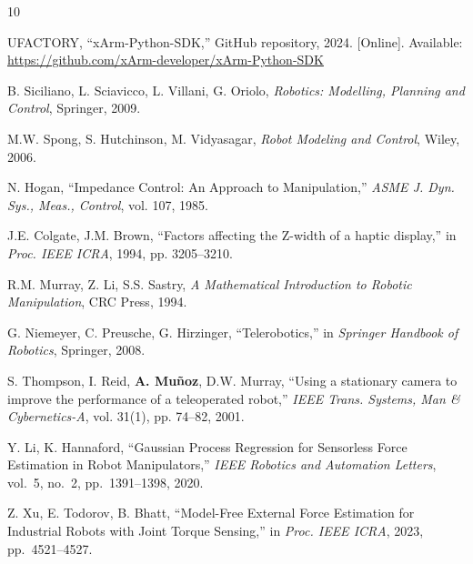 \documentclass[journal,10pt,twoside]{IEEEtran}
\begin{document}
\begin{thebibliography}{10}

  UFACTORY, ``xArm-Python-SDK,''
  GitHub repository, 2024.
  [Online]. Available: \url{https://github.com/xArm-developer/xArm-Python-SDK}

  B. Siciliano, L. Sciavicco, L. Villani, G. Oriolo,
  \textit{Robotics: Modelling, Planning and Control},
  Springer, 2009.

  M.W. Spong, S. Hutchinson, M. Vidyasagar,
  \textit{Robot Modeling and Control},
  Wiley, 2006.

  N. Hogan,
  ``Impedance Control: An Approach to Manipulation,''
  \textit{ASME J. Dyn. Sys., Meas., Control},
  vol. 107, 1985.

  J.E. Colgate, J.M. Brown,
  ``Factors affecting the Z-width of a haptic display,''
  in \textit{Proc. IEEE ICRA}, 1994, pp. 3205--3210.

  R.M. Murray, Z. Li, S.S. Sastry,
  \textit{A Mathematical Introduction to Robotic Manipulation},
  CRC Press, 1994.

  G. Niemeyer, C. Preusche, G. Hirzinger,
  ``Telerobotics,''
  in \textit{Springer Handbook of Robotics},
  Springer, 2008.

  S. Thompson, I. Reid, \textbf{A. Muñoz}, D.W. Murray,
  ``Using a stationary camera to improve the performance
  of a teleoperated robot,''
  \textit{IEEE Trans. Systems, Man \& Cybernetics-A},
  vol. 31(1), pp. 74--82, 2001.

  Y. Li, K. Hannaford,
  ``Gaussian Process Regression for Sensorless Force Estimation
  in Robot Manipulators,''
  \textit{IEEE Robotics and Automation Letters},
  vol.~5, no.~2, pp.~1391--1398, 2020.

  Z. Xu, E. Todorov, B. Bhatt,
  ``Model-Free External Force Estimation for Industrial Robots
  with Joint Torque Sensing,''
  in \textit{Proc. IEEE ICRA}, 2023, pp.~4521--4527.

\end{thebibliography}

\appendix
\end{document}
